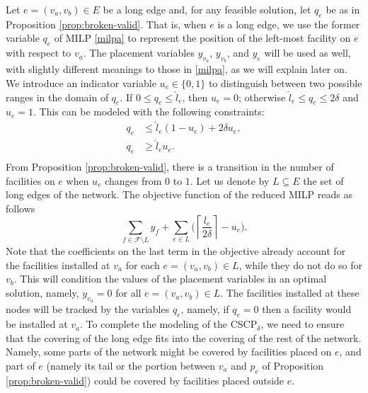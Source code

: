 \documentclass[review]{elsarticle}
\newcommand{\cF}{{\mathcal F}}
\newcommand{\dlt}{{\delta}}
\newcommand{\problem}{CSCP$_\dlt$}
\theoremstyle{definition}
\begin{document}
Let $e=(v_a,v_b)\in E$ be a long edge and, for any feasible solution, let $q_e$ be as in Proposition \ref{prop:broken-valid}. That is, when $e$ is a long edge, we use the former variable $q_e$ of MILP \eqref{milpa} to represent the position of the left-most facility on $e$ with respect to $v_a$. The placement variables $y_{v_a}$, $y_{v_b}$, and $y_e$ will be used as well, with slightly different meanings to those in \eqref{milpa}, as we will explain later on. We introduce an indicator variable $u_{e}\in\{0,1\}$ to distinguish between two possible ranges in the domain of $q_e$.  If $0 \le q_{e} \le \hat l_e$, then $u_{e} =0$; otherwise $\hat l_{e} \le q_{e} \le 2\dlt$ and $u_{e} =1$.  This can be modeled with the following constraints:
\begin{equation}
\label{eq.cvu}
\begin{split}
	q_{e} &\le \hat l_e (1-u_{e})   +2\dlt u_{e},\\
	q_{e} &\ge \hat l_e u_{e}. \\
\end{split}
\end{equation}
From Proposition \ref{prop:broken-valid},  there is a  transition in the number of facilities on $e$ when $u_{e}$ changes from $0$ to $1$. Let us denote by $L\subseteq E$ the set of long edges of the network. The objective function of the reduced MILP reads as follows
\begin{equation}\label{obj-new}
	\sum_{f\in\cF\setminus L} y_f + \sum_{e\in L} \Big(\left\lceil \frac{l_e}{2\dlt}\right\rceil -u_e\Big).
\end{equation}
Note that the coefficients on the last term in the objective already account for the facilities installed at $v_a$ for each $e=(v_a,v_b)\in L$, while they do not do so for $v_b$. This will condition the values of the placement variables in an optimal solution, namely, $y_{v_a}=0$ for all $e=(v_a,v_b)\in L$. The facilities installed at these nodes will be tracked by the variables $q_e$, namely, if $q_e=0$ then a facility would be installed at $v_a$. To complete the modeling of the \problem, we need to ensure that the covering of the long edge fits into the covering of the rest of the network. Namely, some parts of the network might be covered by facilities placed on $e$, and part of $e$ (namely its tail or the portion between $v_a$ and $p_e$ of Proposition \ref{prop:broken-valid}) could be covered by facilities placed outside $e$.
\end{document}
